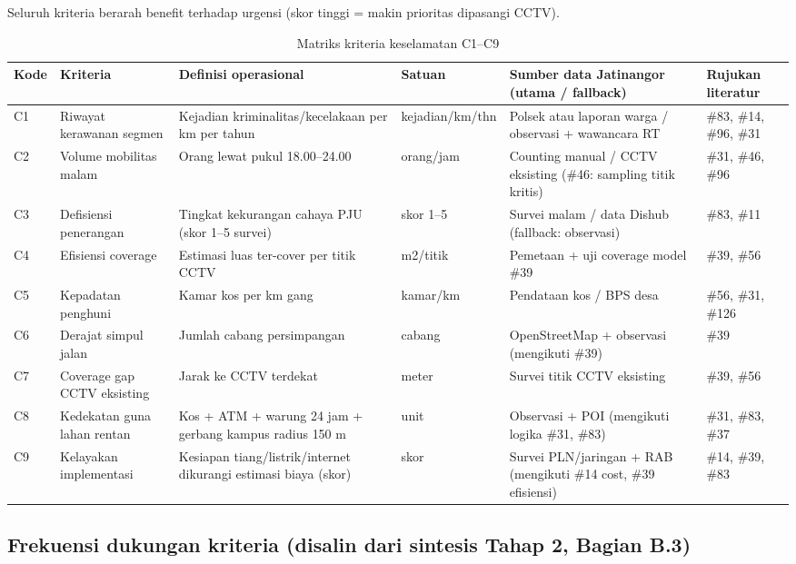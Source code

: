 \documentclass[a4paper,11pt]{article}
\begin{document}
Seluruh kriteria berarah benefit terhadap urgensi (skor tinggi = makin prioritas dipasangi CCTV).

\begin{table}[htbp]
\centering
\small
\setlength{\tabcolsep}{3pt}
\begin{tabular}{p{0.9cm}p{2.3cm}p{3.8cm}p{1.4cm}p{3.6cm}p{2.0cm}}
\toprule
\textbf{Kode} & \textbf{Kriteria} & \textbf{Definisi operasional} & \textbf{Satuan} & \textbf{Sumber data Jatinangor (utama / fallback)} & \textbf{Rujukan literatur} \\
\midrule
C1 & Riwayat kerawanan segmen & Kejadian kriminalitas/kecelakaan per km per tahun & kejadian/km/thn & Polsek atau laporan warga / observasi + wawancara RT & \#83, \#14, \#96, \#31 \\
C2 & Volume mobilitas malam & Orang lewat pukul 18.00--24.00 & orang/jam & Counting manual / CCTV eksisting (\#46: sampling titik kritis) & \#31, \#46, \#96 \\
C3 & Defisiensi penerangan & Tingkat kekurangan cahaya PJU (skor 1--5 survei) & skor 1--5 & Survei malam / data Dishub (fallback: observasi) & \#83, \#11 \\
C4 & Efisiensi coverage & Estimasi luas ter-cover per titik CCTV & m2/titik & Pemetaan + uji coverage model \#39 & \#39, \#56 \\
C5 & Kepadatan penghuni & Kamar kos per km gang & kamar/km & Pendataan kos / BPS desa & \#56, \#31, \#126 \\
C6 & Derajat simpul jalan & Jumlah cabang persimpangan & cabang & OpenStreetMap + observasi (mengikuti \#39) & \#39 \\
C7 & Coverage gap CCTV eksisting & Jarak ke CCTV terdekat & meter & Survei titik CCTV eksisting & \#39, \#56 \\
C8 & Kedekatan guna lahan rentan & Kos + ATM + warung 24 jam + gerbang kampus radius 150 m & unit & Observasi + POI (mengikuti logika \#31, \#83) & \#31, \#83, \#37 \\
C9 & Kelayakan implementasi & Kesiapan tiang/listrik/internet dikurangi estimasi biaya (skor) & skor & Survei PLN/jaringan + RAB (mengikuti \#14 cost, \#39 efisiensi) & \#14, \#39, \#83 \\
\bottomrule
\end{tabular}
\caption{Matriks kriteria keselamatan C1--C9}
\end{table}

\subsection{Frekuensi dukungan kriteria (disalin dari sintesis Tahap 2, Bagian B.3)}
\end{document}
